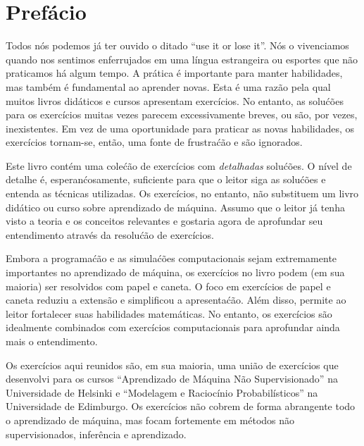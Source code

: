 \chapter{Pref\'acio}
\label{ch:preface}
Todos n\'os podemos j\'a ter ouvido o ditado ``use it or lose it''. N\'os o vivenciamos quando nos sentimos enferrujados em uma l\'ingua estrangeira ou esportes que n\~ao praticamos h\'a algum tempo. A pr\'atica \'e importante para manter habilidades, mas tamb\'em \'e fundamental ao aprender novas. Esta \'e uma raz\~ao pela qual muitos livros did\'aticos e cursos apresentam exerc\'icios. No entanto, as solu\'c\~oes para os exerc\'icios muitas vezes parecem excessivamente breves, ou s\~ao, por vezes, inexistentes. Em vez de uma oportunidade para praticar as novas habilidades, os exerc\'icios tornam-se, ent\~ao, uma fonte de frustra\'c\~ao e s\~ao ignorados.

\hspace{2ex} Este livro cont\'em uma cole\'c\~ao de exerc\'icios com \emph{detalhadas} solu\'c\~oes. O n\'ivel de detalhe \'e, esperan\'cosamente, suficiente para que o leitor siga as solu\'c\~oes e entenda as t\'ecnicas utilizadas. Os exerc\'icios, no entanto, n\~ao substituem um livro did\'atico ou curso sobre aprendizado de m\'aquina. Assumo que o leitor j\'a tenha visto a teoria e os conceitos relevantes e gostaria agora de aprofundar seu entendimento atrav\'es da resolu\'c\~ao de exerc\'icios.

\hspace{2ex} Embora a programa\'c\~ao e as simula\'c\~oes computacionais sejam extremamente importantes no aprendizado de m\'aquina, os exerc\'icios no livro podem (em sua maioria) ser resolvidos com papel e caneta. O foco em exerc\'icios de papel e caneta reduziu a extens\~ao e simplificou a apresenta\'c\~ao. Al\'em disso, permite ao leitor fortalecer suas habilidades matem\'aticas. No entanto, os exerc\'icios s\~ao idealmente combinados com exerc\'icios computacionais para aprofundar ainda mais o entendimento.

\hspace{2ex} Os exerc\'icios aqui reunidos s\~ao, em sua maioria, uma uni\~ao de exerc\'icios que desenvolvi para os cursos ``Aprendizado de M\'aquina N\~ao Supervisionado'' na Universidade de Helsinki e ``Modelagem e Racioc\'inio Probabil\'isticos'' na Universidade de Edimburgo. Os exerc\'icios n\~ao cobrem de forma abrangente todo o aprendizado de m\'aquina, mas focam fortemente em m\'etodos n\~ao supervisionados, infer\^encia e aprendizado.

